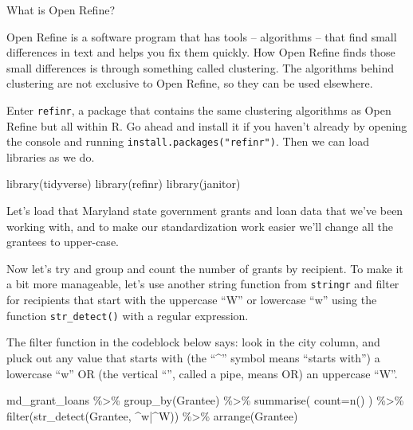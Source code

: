 \documentclass[
  letterpaper,
  DIV=11,
  numbers=noendperiod]{scrreprt}
\newenvironment{Shaded}{\begin{snugshade}}{\end{snugshade}}
\newcommand{\AttributeTok}[1]{\textcolor[rgb]{0.40,0.45,0.13}{#1}}
\newcommand{\FunctionTok}[1]{\textcolor[rgb]{0.28,0.35,0.67}{#1}}
\newcommand{\NormalTok}[1]{\textcolor[rgb]{0.00,0.23,0.31}{#1}}
\newcommand{\SpecialCharTok}[1]{\textcolor[rgb]{0.37,0.37,0.37}{#1}}
\newcommand{\StringTok}[1]{\textcolor[rgb]{0.13,0.47,0.30}{#1}}
\begin{document}
What is Open Refine?

Open Refine is a software program that has tools -- algorithms -- that
find small differences in text and helps you fix them quickly. How Open
Refine finds those small differences is through something called
clustering. The algorithms behind clustering are not exclusive to Open
Refine, so they can be used elsewhere.

Enter \texttt{refinr}, a package that contains the same clustering
algorithms as Open Refine but all within R. Go ahead and install it if
you haven't already by opening the console and running
\texttt{install.packages("refinr")}. Then we can load libraries as we
do.

\begin{Shaded}
\begin{Highlighting}[]
\FunctionTok{library}\NormalTok{(tidyverse)}
\FunctionTok{library}\NormalTok{(refinr)}
\FunctionTok{library}\NormalTok{(janitor)}
\end{Highlighting}
\end{Shaded}

Let's load that Maryland state government grants and loan data that
we've been working with, and to make our standardization work easier
we'll change all the grantees to upper-case.

Now let's try and group and count the number of grants by recipient. To
make it a bit more manageable, let's use another string function from
\texttt{stringr} and filter for recipients that start with the uppercase
``W'' or lowercase ``w'' using the function \texttt{str\_detect()} with
a regular expression.

The filter function in the codeblock below says: look in the city
column, and pluck out any value that starts with (the ``\^{}'' symbol
means ``starts with'') a lowercase ``w'' OR (the vertical
``\textbar{}'', called a pipe, means OR) an uppercase ``W''.

\begin{Shaded}
\begin{Highlighting}[]
\NormalTok{md\_grant\_loans }\SpecialCharTok{\%\textgreater{}\%}
  \FunctionTok{group\_by}\NormalTok{(Grantee) }\SpecialCharTok{\%\textgreater{}\%}
  \FunctionTok{summarise}\NormalTok{(}
    \AttributeTok{count=}\FunctionTok{n}\NormalTok{()}
\NormalTok{  ) }\SpecialCharTok{\%\textgreater{}\%}
  \FunctionTok{filter}\NormalTok{(}\FunctionTok{str\_detect}\NormalTok{(Grantee, }\StringTok{\textquotesingle{}\^{}w|\^{}W\textquotesingle{}}\NormalTok{)) }\SpecialCharTok{\%\textgreater{}\%}
  \FunctionTok{arrange}\NormalTok{(Grantee)}
\end{Highlighting}
\end{Shaded}
\end{document}
